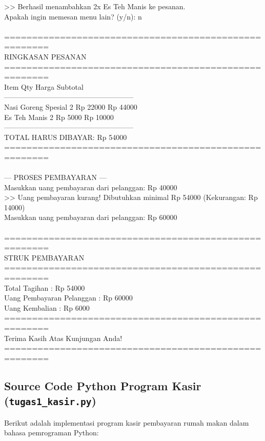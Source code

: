 \documentclass[12pt,a4paper]{article}
\begin{document}
\begin{tcolorbox}[colback=black!90!white,coltext=green!90!white,fontupper=\ttfamily\footnotesize,title=\textbf{Terminal Output: Eksekusi Tugas 1}]
>> Berhasil menambahkan 2x Es Teh Manis ke pesanan.\\
Apakah ingin memesan menu lain? (y/n): n\\
\\
======================================================\\
                   RINGKASAN PESANAN                  \\
======================================================\\
Item                    Qty            Harga      Subtotal\\
------------------------------------------------------\\
Nasi Goreng Spesial     2             Rp 22000    Rp 44000\\
Es Teh Manis            2             Rp  5000    Rp 10000\\
------------------------------------------------------\\
TOTAL HARUS DIBAYAR:                              Rp 54000\\
======================================================\\
\\
--- PROSES PEMBAYARAN ---\\
Masukkan uang pembayaran dari pelanggan: Rp 40000\\
>> Uang pembayaran kurang! Dibutuhkan minimal Rp 54000 (Kekurangan: Rp 14000)\\
Masukkan uang pembayaran dari pelanggan: Rp 60000\\
\\
======================================================\\
                   STRUK PEMBAYARAN                   \\
======================================================\\
Total Tagihan                 : Rp 54000\\
Uang Pembayaran Pelanggan     : Rp 60000\\
Uang Kembalian                : Rp 6000\\
======================================================\\
          Terima Kasih Atas Kunjungan Anda!          \\
======================================================
\end{tcolorbox}

\subsection{Source Code Python Program Kasir (\texttt{tugas1\_kasir.py})}
Berikut adalah implementasi program kasir pembayaran rumah makan dalam bahasa pemrograman Python:
\end{document}
